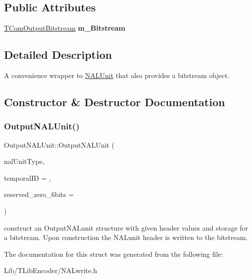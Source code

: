 \subsection*{Public Attributes}
\begin{DoxyCompactItemize}
\item 
\mbox{\label{struct_output_n_a_l_unit_a2994708c7a43dda8d1bfd18d5229074d}} 
\hyperlink{class_t_com_output_bitstream}{T\+Com\+Output\+Bitstream} {\bfseries m\+\_\+\+Bitstream}
\end{DoxyCompactItemize}


\subsection{Detailed Description}
A convenience wrapper to \hyperlink{struct_n_a_l_unit}{N\+A\+L\+Unit} that also provides a bitstream object. 

\subsection{Constructor \& Destructor Documentation}
\mbox{\label{struct_output_n_a_l_unit_a7dffded9144a8059e39113401d23703f}} 
\subsubsection{\texorpdfstring{Output\+N\+A\+L\+Unit()}{OutputNALUnit()}}
{\footnotesize\ttfamily Output\+N\+A\+L\+Unit\+::\+Output\+N\+A\+L\+Unit (\begin{DoxyParamCaption}\item[{Nal\+Unit\+Type}]{nal\+Unit\+Type,  }\item[{U\+Int}]{temporal\+ID = {},  }\item[{U\+Int}]{reserved\+\_\+zero\+\_\+6bits = {} }\end{DoxyParamCaption})\hspace{0.3cm}{\ttfamily [inline]}}

construct an Output\+N\+A\+Lunit structure with given header values and storage for a bitstream. Upon construction the N\+A\+Lunit header is written to the bitstream. 

The documentation for this struct was generated from the following file\+:\begin{DoxyCompactItemize}
\item 
Lib/\+T\+Lib\+Encoder/N\+A\+Lwrite.\+h\end{DoxyCompactItemize}
